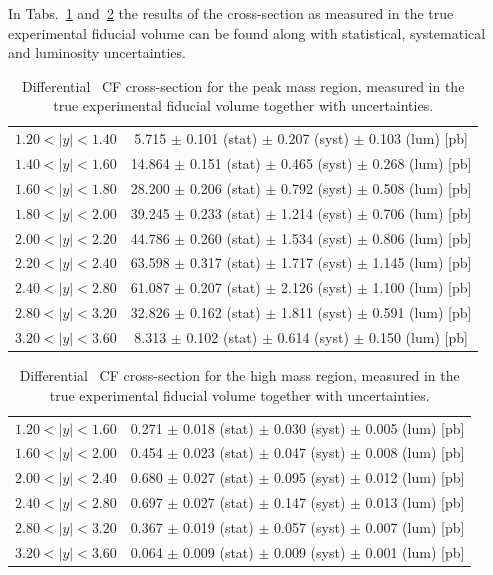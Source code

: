 In Tabs.~\ref{tab:Zee_peak} and~\ref{tab:Zee_high} the results of the cross-section as measured in the true experimental fiducial volume can be found along with statistical, systematical and luminosity uncertainties.

\begin{table}
\centering
\begin{tabular}{lc}
\hline \hline
$1.20 < |y| <1.40$          & 5.715 $\pm$ 0.101 (stat) $\pm$ 0.207 (syst) $\pm$ 0.103 (lum) [pb]  \\
$1.40 < |y| <1.60$          & 14.864 $\pm$ 0.151 (stat) $\pm$ 0.465 (syst) $\pm$ 0.268 (lum) [pb]  \\
$1.60 < |y| <1.80$          & 28.200 $\pm$ 0.206 (stat) $\pm$ 0.792 (syst) $\pm$ 0.508 (lum) [pb]  \\
$1.80 < |y| <2.00$          & 39.245 $\pm$ 0.233 (stat) $\pm$ 1.214 (syst) $\pm$ 0.706 (lum) [pb]  \\
$2.00 < |y| <2.20$          & 44.786 $\pm$ 0.260 (stat) $\pm$ 1.534 (syst) $\pm$ 0.806 (lum) [pb]  \\
$2.20 < |y| <2.40$          & 63.598 $\pm$ 0.317 (stat) $\pm$ 1.717 (syst) $\pm$ 1.145 (lum) [pb]  \\
$2.40 < |y| <2.80$          & 61.087 $\pm$ 0.207 (stat) $\pm$ 2.126 (syst) $\pm$ 1.100 (lum) [pb]  \\
$2.80 < |y| <3.20$          & 32.826 $\pm$ 0.162 (stat) $\pm$ 1.811 (syst) $\pm$ 0.591 (lum) [pb]  \\
$3.20 < |y| <3.60$          & 8.313 $\pm$ 0.102 (stat) $\pm$ 0.614 (syst) $\pm$ 0.150 (lum) [pb]  \\
\hline \hline
\end{tabular}
\caption{Differential \Zee\ CF cross-section for the peak mass region, measured in the true experimental fiducial volume together with uncertainties.}
\label{tab:Zee_peak}
\end{table}

\begin{table}
\centering
\begin{tabular}{lc}
\hline \hline
$1.20 < |y| <1.60$          & 0.271 $\pm$ 0.018 (stat) $\pm$ 0.030 (syst) $\pm$ 0.005 (lum) [pb]  \\
$1.60 < |y| <2.00$          & 0.454 $\pm$ 0.023 (stat) $\pm$ 0.047 (syst) $\pm$ 0.008 (lum) [pb]  \\
$2.00 < |y| <2.40$          & 0.680 $\pm$ 0.027 (stat) $\pm$ 0.095 (syst) $\pm$ 0.012 (lum) [pb]  \\
$2.40 < |y| <2.80$          & 0.697 $\pm$ 0.027 (stat) $\pm$ 0.147 (syst) $\pm$ 0.013 (lum) [pb]  \\
$2.80 < |y| <3.20$          & 0.367 $\pm$ 0.019 (stat) $\pm$ 0.057 (syst) $\pm$ 0.007 (lum) [pb]  \\
$3.20 < |y| <3.60$          & 0.064 $\pm$ 0.009 (stat) $\pm$ 0.009 (syst) $\pm$ 0.001 (lum) [pb]  \\
\hline \hline
\end{tabular}
\caption{Differential \Zee\ CF cross-section for the high mass region, measured in the true experimental fiducial volume together with uncertainties.}
\label{tab:Zee_high}
\end{table}

